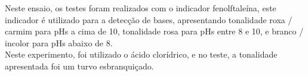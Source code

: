 \begin{figure}[h]
                \label{fig:experimento14}
        \end{figure}
		
		\indent Neste ensaio, os testes foram realizados com o indicador fenolftaleína, este indicador é utilizado para a detecção de bases, apresentando tonalidade roxa / carmim para pHs a cima de 10, tonalidade rosa para pHs entre 8 e 10, e branco / incolor para pHs abaixo de 8. \\
		
		\indent Neste experimento, foi utilizado o ácido clorídrico, e no teste, a tonalidade apresentada foi um turvo esbranquiçado.
		
        \newpage

